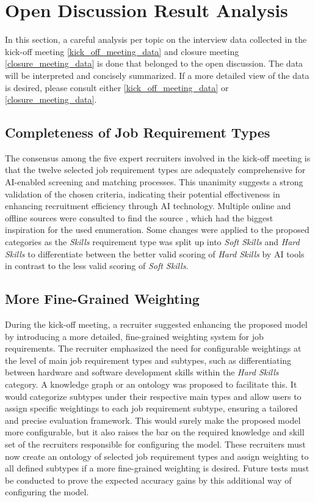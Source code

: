 \documentclass[draft,final]{thesisclass} %
\begin{document}
\section{Open Discussion Result Analysis} \label{open_discussion_result_analysis}
In this section, a careful analysis per topic on the interview data collected in the kick-off meeting \ref{kick_off_meeting_data} and closure meeting \ref{closure_meeting_data} is done that belonged to the open discussion. The data will be interpreted and concisely summarized. If a more detailed view of the data is desired, please consult either \ref{kick_off_meeting_data} or \ref{closure_meeting_data}.

\subsection{Completeness of Job Requirement Types}
The consensus among the five expert recruiters involved in the kick-off meeting is that the twelve selected job requirement types are adequately comprehensive for \acs{AI}-enabled screening and matching processes. This unanimity suggests a strong validation of the chosen criteria, indicating their potential effectiveness in enhancing recruitment efficiency through \acs{AI} technology. Multiple online and offline sources were consulted to find the source \textcite{job_requirement_types}, which had the biggest inspiration for the used enumeration. Some changes were applied to the proposed categories as the \textit{Skills} requirement type was split up into \textit{Soft Skills} and \textit{Hard Skills} to differentiate between the better valid scoring of \textit{Hard Skills} by \acs{AI} tools in contrast to the less valid scoring of \textit{Soft Skills}.

\subsection{More Fine-Grained Weighting}
During the kick-off meeting, a recruiter suggested enhancing the proposed model by introducing a more detailed, fine-grained weighting system for job requirements. The recruiter emphasized the need for configurable weightings at the level of main job requirement types and subtypes, such as differentiating between hardware and software development skills within the \textit{Hard Skills} category. A knowledge graph or an ontology was proposed to facilitate this. It would categorize subtypes under their respective main types and allow users to assign specific weightings to each job requirement subtype, ensuring a tailored and precise evaluation framework. This would surely make the proposed model more configurable, but it also raises the bar on the required knowledge and skill set of the recruiters responsible for configuring the model. These recruiters must now create an ontology of selected job requirement types and assign weighting to all defined subtypes if a more fine-grained weighting is desired. Future tests must be conducted to prove the expected accuracy gains by this additional way of configuring the model.
\end{document}

